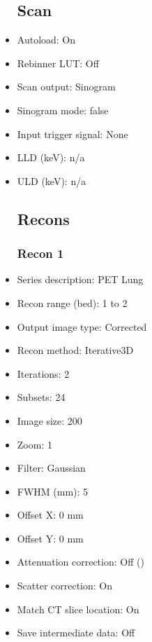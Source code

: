 \documentclass[12pt]{article}
\begin{document}
\begin{itemize}
\subsection{Scan}
\item Autoload: On
\item Rebinner LUT: Off
\item Scan output: Sinogram
\item Sinogram mode: false
\item Input trigger signal: None
\item LLD (keV): n/a
\item ULD (keV): n/a
\subsection{Recons}
\subsubsection{Recon 1}
\item Series description: PET Lung
\item Recon range (bed): 1 to 2
\item Output image type: Corrected
\item Recon method: Iterative3D
\item Iterations: 2
\item Subsets: 24
\item Image size: 200
\item Zoom: 1
\item Filter: Gaussian
\item FWHM (mm): 5
\item Offset X: 0 mm
\item Offset Y: 0 mm
\item Attenuation correction: Off ()
\item Scatter correction: On
\item Match CT slice location: On
\item Save intermediate data: Off
\end{itemize}
\end{document}
